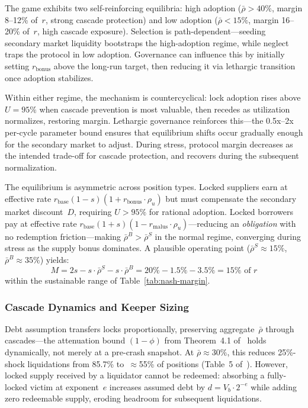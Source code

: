 \documentclass[10pt,a4paper,twocolumn]{article}
\theoremstyle{definition}
\theoremstyle{plain}
\theoremstyle{remark}
\begin{document}
The game exhibits two self-reinforcing equilibria: high adoption ($\bar{\rho} > 40\%$, margin 8--12\% of~$r$, strong cascade protection) and low adoption ($\bar{\rho} < 15\%$, margin 16--20\% of~$r$, high cascade exposure). Selection is path-dependent---seeding secondary market liquidity bootstraps the high-adoption regime, while neglect traps the protocol in low adoption. Governance can influence this by initially setting $r_{\text{bonus}}$ above the long-run target, then reducing it via lethargic transition once adoption stabilizes.

Within either regime, the mechanism is countercyclical: lock adoption rises above $U = 95\%$ when cascade prevention is most valuable, then recedes as utilization normalizes, restoring margin. Lethargic governance reinforces this---the 0.5x--2x per-cycle parameter bound ensures that equilibrium shifts occur gradually enough for the secondary market to adjust. During stress, protocol margin decreases as the intended trade-off for cascade protection, and recovers during the subsequent normalization.

The equilibrium is asymmetric across position types. Locked suppliers earn at effective rate $r_{\text{base}}(1{-}s)(1{+}r_{\text{bonus}} \cdot \rho_u)$ but must compensate the secondary market discount~$D$, requiring $U > 95\%$ for rational adoption. Locked borrowers pay at effective rate $r_{\text{base}}(1{+}s)(1{-}r_{\text{malus}} \cdot \rho_u)$---reducing an \emph{obligation} with no redemption friction---making $\bar{\rho}^B > \bar{\rho}^S$ in the normal regime, converging during stress as the supply bonus dominates. A plausible operating point ($\bar{\rho}^S \approx 15\%$, $\bar{\rho}^B \approx 35\%$) yields:
\begin{equation}
M = 2s - s \cdot \bar{\rho}^S - s \cdot \bar{\rho}^B = 20\% - 1.5\% - 3.5\% = 15\% \text{ of } r
\end{equation}
within the sustainable range of Table~\ref{tab:nash-margin}.

\subsubsection{Cascade Dynamics and Keeper Sizing}

Debt assumption transfers locks proportionally, preserving aggregate~$\bar{\rho}$ through cascades---the attenuation bound $(1{-}\phi)$ from Theorem~4.1 of~\cite{wp} holds dynamically, not merely at a pre-crash snapshot. At $\bar{\rho} \approx 30\%$, this reduces 25\%-shock liquidations from 85.7\% to~$\approx$55\% of positions (Table~5 of~\cite{wp}). However, locked supply received by a liquidator cannot be redeemed: absorbing a fully-locked victim at exponent~$e$ increases assumed debt by $d = V_b \cdot 2^{-e}$ while adding zero redeemable supply, eroding headroom for subsequent liquidations.
\end{document}
